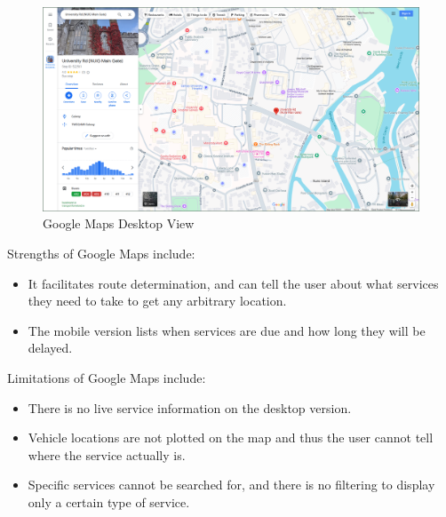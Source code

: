 \documentclass[a4paper,11pt]{article}
\begin{document}
\begin{minipage}{0.80\textwidth} 
\begin{figure}[H]
    \centering
    \includegraphics[width=\textwidth]{./images/gdesk.png}
    \caption{Google Maps Desktop View}
\end{figure}
\end{minipage}

Strengths of Google Maps include:
\begin{itemize}
    \item   It facilitates route determination, and can tell the user about what services they need to take to get any arbitrary location.
    \item   The mobile version lists when services are due and how long they will be delayed.
\end{itemize}

Limitations of Google Maps include:
\begin{itemize}
    \item   There is no live service information on the desktop version.
    \item   Vehicle locations are not plotted on the map and thus the user cannot tell where the service actually is.
    \item   Specific services cannot be searched for, and there is no filtering to display only a certain type of service.
\end{itemize}
\end{document}
